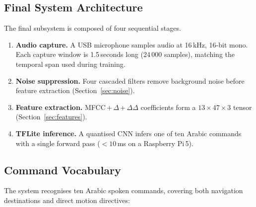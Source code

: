 \documentclass[12pt,a4paper]{report}
\begin{document}
\subsection{Final System Architecture}
\label{sec:architecture}



The final subsystem is composed of four sequential stages.

\begin{enumerate}
  \item \textbf{Audio capture.} A USB microphone samples audio at 16\,kHz, 16-bit mono. Each capture window is 1.5\,seconds long (24\,000 samples), matching the temporal span used during training.
  \item \textbf{Noise suppression.} Four cascaded filters remove background noise before feature extraction (Section~\ref{sec:noise}).
  \item \textbf{Feature extraction.} MFCC\,+\,$\Delta$\,+\,$\Delta\Delta$ coefficients \cite{Darabkh2013} form a $13\times47\times3$ tensor (Section~\ref{sec:features}).
  \item \textbf{TFLite inference.} A quantised CNN infers one of ten Arabic commands with a single forward pass ($<\!10$\,ms on a Raspberry Pi\,5).
\end{enumerate}

\subsection{Command Vocabulary}
\label{sec:commands}

The system recognises ten Arabic spoken commands, covering both navigation destinations and direct motion directives:
\end{document}
